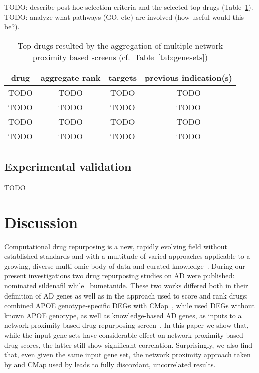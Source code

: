 \documentclass[letterpaper]{article}
\begin{document}
TODO: describe post-hoc selection criteria and the selected top drugs
(Table~\ref{tab:top-drugs}).  TODO: analyze what pathways (GO, etc) are
involved (how useful would this be?).

\begin{table}
\footnotesize
\begin{tabular}{cccc}
drug     & aggregate rank & targets & previous indication(s)  \\
\hline
TODO & TODO & TODO & TODO \\
TODO & TODO & TODO & TODO \\
TODO & TODO & TODO & TODO \\
TODO & TODO & TODO & TODO \\
\end{tabular}
\caption{
Top drugs resulted by the aggregation of multiple network proximity based
screens (cf.~Table~\ref{tab:genesets})
}
\label{tab:top-drugs}
\end{table}

\subsection{Experimental validation}

TODO

\section{Discussion}

Computational drug repurposing is a new, rapidly evolving field without
established standards and with a multitude of varied approaches applicable to
a growing, diverse multi-omic body of data and curated
knowledge~\citep{Pushpakom2019}.  During our present investigations two drug
repurposing studies on AD were published: \cite{Fang2021} nominated sildenafil
while~\cite{Taubes2021} bumetanide.  These two works differed both in their
definition of AD genes as well as in the approach used to score and rank
drugs: \cite{Taubes2021} combined APOE genotype-specific DEGs with
CMap~\citep{Lamb2006}, while \cite{Fang2021} used DEGs without known APOE
genotype, as well as knowledge-based AD genes, as inputs to a network
proximity based drug repurposing screen~\citep{Cheng2018}.  In this paper we
show that, while the input gene sets have considerable effect on network
proximity based drug scores, the latter still show significant correlation.
Surprisingly, we also find that, even given the same input gene set, the
network proximity approach taken by \cite{Fang2021} and CMap used by
\cite{Taubes2021} leads to fully discordant, uncorrelated results.
\end{document}
